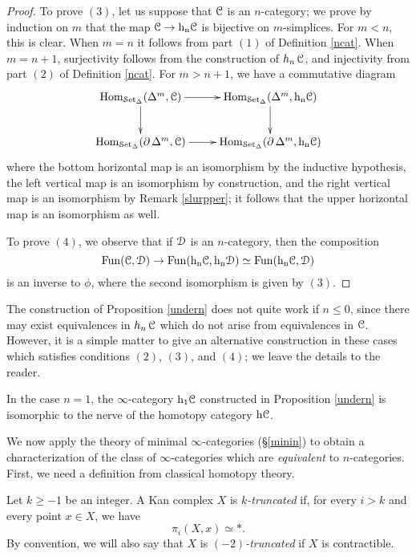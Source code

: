 \begin{proof}
To prove $(3)$, let us suppose that $\operatorname{\mathcal{C}}$ is an $n$-category; we prove by induction on $m$ that the map $\operatorname{\mathcal{C}} \rightarrow \rm{h}_{n} \! \operatorname{\mathcal{C}}$ is bijective on $m$-simplices. For $m < n$, this is clear. When $m = n$ it follows from part $(1)$ of Definition \ref{ncat}. When $m = n+1$, surjectivity follows from the construction of $h_n \operatorname{\mathcal{C}}$, and injectivity from part $(2)$ of Definition \ref{ncat}.
For $m > n+1$, we have a commutative diagram
$$ \xymatrix{ \Hom_{\sSet}( \Delta^m, \calC ) \ar[r] \ar[d] & \Hom_{\sSet}( \Delta^m, \hn{n}{ \calC}) \ar[d] \\
\Hom_{\sSet}( \bd \Delta^m, \calC ) \ar[r] & \Hom_{\sSet}( \bd \Delta^m, \hn{n}{\calC}) }$$
where the bottom horizontal map is an isomorphism by the inductive hypothesis, the
left vertical map is an isomorphism by construction, and the right vertical map is an isomorphism by Remark \ref{slurpper}; it follows that the upper horizontal map is an isomorphism as well.

To prove $(4)$, we observe that if $\operatorname{\mathcal{D}}$ is an $n$-category, then the composition
$$ \operatorname{Fun}( \operatorname{\mathcal{C}}, \operatorname{\mathcal{D}}) \rightarrow \operatorname{Fun}( \rm{h}_{n} \!  \operatorname{\mathcal{C}}, \rm{h}_{n} \!  \operatorname{\mathcal{D}})
\simeq \operatorname{Fun}( \rm{h}_{n} \!  \operatorname{\mathcal{C}}, \operatorname{\mathcal{D}} )$$
is an inverse to $\phi$, where the second isomorphism is given by $(3)$.
\end{proof}

\begin{remark}
The construction of Proposition \ref{undern} does not quite work if $n \leq 0$, since there
may exist equivalences in $h_n \operatorname{\mathcal{C}}$ which do not arise from equivalences in $\operatorname{\mathcal{C}}$. 
However, it is a simple matter to give an alternative construction in these cases which
satisfies conditions $(2)$, $(3)$, and $(4)$; we leave the details to the reader.
\end{remark}

\begin{remark}
In the case $n=1$, the $\infty$-category $\rm{h}_{1} \! \operatorname{\mathcal{C}}$ constructed in Proposition \ref{undern}
is isomorphic to the nerve of the homotopy category $\rm{h} \it{\operatorname{\mathcal{C}}}$.
\end{remark}

We now apply the theory of minimal $\infty$-categories (\S \ref{minin}) to obtain a characterization of the class of $\infty$-categories which are {\em equivalent} to $n$-categories. First, we need a definition from classical homotopy theory.

\begin{definition}\label{trunckan}
Let $k \geq -1$ be an integer. A Kan complex $X$ is {\it $k$-truncated} if, for every $i > k$ and every point $x \in X$, we have $$ \pi_{i}(X,x) \simeq \ast.$$
By convention, we will also say that $X$ is {\it $(-2)$-truncated} if $X$ is contractible.
\end{definition}

